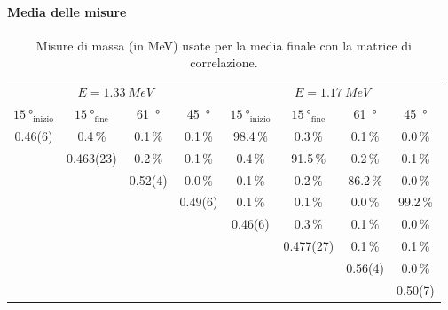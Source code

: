 \paragraph{Media delle misure}

\begin{table}
	\centering
	\begin{tabular}{cccc|cccc}
		\toprule
		\multicolumn{4}{c|}{$E=\SI{1.33}{MeV}$} & \multicolumn{4}{c}{$E=\SI{1.17}{MeV}$} \\
		$\SI{15}{\degree}_\text{inizio}$ & $\SI{15}{\degree}_\text{fine}$ & \SI{61}{\degree} & \SI{45}{\degree} & $\SI{15}{\degree}_\text{inizio}$ & $\SI{15}{\degree}_\text{fine}$ & \SI{61}{\degree} & \SI{45}{\degree} \\
		\midrule
	   0.46(6) &     0.4\,\%  &   0.1\,\% &    0.1\,\% &   98.4\,\% &     0.3\,\% &   0.1\,\% &   0.0\,\% \\
	           & 0.463(23)  &   0.2\,\% &    0.1\,\% &    0.4\,\% &    91.5\,\% &   0.2\,\% &   0.1\,\% \\
	           &            & 0.52(4) &    0.0\,\% &    0.1\,\% &     0.2\,\% &  86.2\,\% &   0.0\,\% \\
	           &            &         &  0.49(6) &    0.1\,\% &     0.1\,\% &   0.0\,\% &  99.2\,\% \\
	           &            &         &          &  0.46(6) &     0.3\,\% &   0.1\,\% &   0.0\,\% \\
	           &            &         &          &          & 0.477(27) &   0.1\,\% &   0.1\,\% \\
	           &            &         &          &          &           & 0.56(4) &   0.0\,\% \\
	           &            &         &          &          &           &         & 0.50(7) \\
		\bottomrule
	\end{tabular}
	\caption{\label{tab:cov}
	Misure di massa (in \si{MeV}) usate per la media finale con la matrice di correlazione.}
\end{table}

